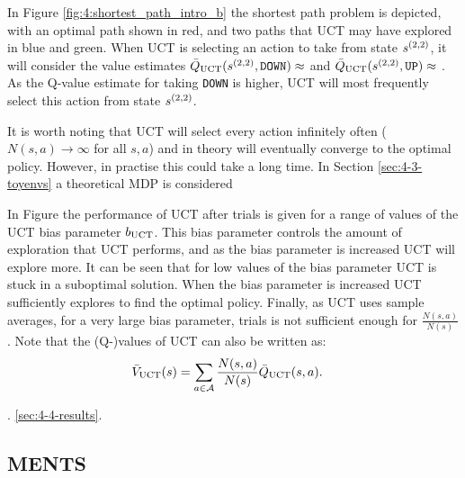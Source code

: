         In Figure \ref{fig:4:shortest_path_intro_b} the shortest path problem is depicted, with an optimal path shown in red, and two paths that UCT may have explored in blue and green. When UCT is selecting an action to take from state $s^{(2,2)}$, it will consider the value estimates ${\bar{Q}_{{\textnormal{UCT}}}}(s^{(2,2)},\texttt{DOWN})\approx $  and $ {\bar{Q}_{{\textnormal{UCT}}}}(s^{(2,2)},\texttt{UP})\approx $ . As the Q-value estimate for taking \texttt{DOWN} is higher, UCT will most frequently select this action from state $s^{(2,2)}$. 

        It is worth noting that UCT will select every action infinitely often ($N(s,a)\rightarrow \infty$ for all $s,a$) and in theory will eventually converge to the optimal policy. However, in practise this could take a long time. In Section \ref{sec:4-3-toyenvs} a theoretical MDP is considered 

        In Figure  the performance of UCT after  trials is given for a range of values of the UCT bias parameter ${b_{{\textnormal{UCT}}}}$. This bias parameter controls the amount of exploration that UCT performs, and as the bias parameter is increased UCT will explore more. It can be seen that for low values of the bias parameter UCT is stuck in a suboptimal solution. When the bias parameter is increased UCT sufficiently explores to find the optimal policy. Finally, as UCT uses sample averages, for a very large bias parameter,  trials is not sufficient enough for $\frac{N(s,a)}{N(s)}$ . Note that the (Q-)values of UCT can also be written as:
        \begin{align}
            {\bar{V}_{{\textnormal{UCT}}}}(s) &= \sum_{a \in \mathcal{A}} \frac{N(s,a)}{N(s)}{\bar{Q}_{{\textnormal{UCT}}}}(s,a).
        \end{align} 
        
         .  \ref{sec:4-4-results}.


    
    
    \subsection{MENTS}

